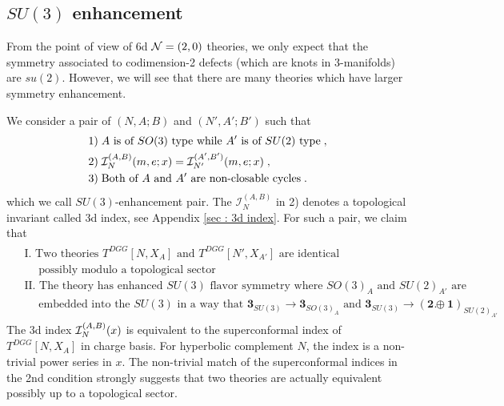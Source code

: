 \documentclass[a4paper,11pt]{article}
\def\cI{\mathcal{I}}
\def\CI{{\cal I}}
\def\CN{{\cal N}}
\begin{document}
\subsection{$SU(3)$ enhancement}\label{sec:SU(3)}
From the point of view of 6d $\CN=(2,0)$ theories, we only expect that the symmetry associated to codimension-2 defects (which are knots in 3-manifolds)
are $su(2)$. However, we will see that there are many theories which have larger symmetry enhancement.

We consider a pair of $(N,A;B)$ and $(N',A';B')$ such that 
%
\begin{align}
\begin{split}
&1) \;\textrm{$A$ is of $SO(3)$ type  while $A'$ is of $SU(2)$ type}\;,
\\
&2) \;\cI_{N}^{(A,B)} (m,e;x)= \cI_{N'}^{(A',B')} (m,e;x)\;,
\\
&3)\; \textrm{Both of $A$ and $A'$ are  non-closable cycles\;.} \label{Def: SU(3) pair}
\end{split}
\end{align}
%
which we call $SU(3)$-enhancement pair. The $\cI_{N}^{(A,B)}$ in 2) denotes a topological invariant called 3d index, see Appendix \ref{sec : 3d index}. For such a  pair,  we claim  that 
%
\begin{align}
\begin{split}
&\textrm{I. Two theories $T^{DGG}[N,X_A]$ and $T^{DGG}[N',X_{A'}]$ are identical}
\\
&\quad \;\textrm{possibly modulo a topological sector}
\\
&\textrm{II. The theory has enhanced $SU(3)$ flavor symmetry where $SO(3)_{A}$  and $SU(2)_{A'}$ are}
\\
&\quad \;\textrm{embedded into the $SU(3)$ in a way that $\mathbf{3}_{SU(3)}\rightarrow \mathbf{3}_{SO(3)_{A}}$ and $\mathbf{3}_{SU(3)}\rightarrow (\mathbf{2}\oplus \mathbf{1})_{SU(2)_{A'}}$}\;. \label{claim : SU(3) enhancement}
\end{split}
\end{align}
%
The 3d index $\CI_{N}^{(A,B)}(x)$ is equivalent to the superconformal index of $T^{DGG}[N,X_A]$ in charge basis. For hyperbolic  complement $N$, the index is  a non-trivial power series in $x$. The non-trivial match of the superconformal indices in the 2nd condition strongly suggests that two theories are actually equivalent  possibly up to a topological sector.  
\end{document}
